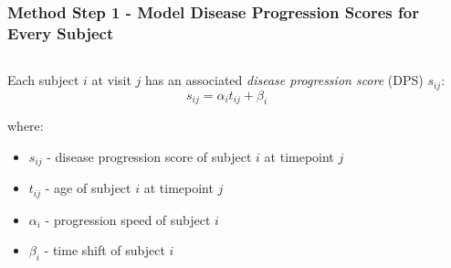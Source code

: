 \documentclass[8pt,xcolor=table]{beamer}
\begin{document}
\begin{frame}
\frametitle{Method Step 1 - Model Disease Progression Scores for Every Subject}

\begin{columns}[T]
    \begin{column}{.7\textwidth}
    
%       
% 
    
    
    \vspace{-2em}
   
    Each subject $i$ at visit $j$ has an associated \emph{disease progression score} (DPS) $s_{ij}$:
      $$s_{ij} = \alpha_i t_{ij} + \beta_i$$
      
      where:
      \begin{itemize}
       \item $s_{ij}$ - disease progression score of subject $i$ at timepoint $j$
       \item $t_{ij}$ - age of subject $i$ at timepoint $j$
       \item $\alpha_i $ - progression speed of subject $i$
       \item $\beta_i $ - time shift of subject $i$
      \end{itemize}
            
     

    \end{column}
    \hspace{-2em}
    \begin{column}{.25\textwidth}
    

\end{column}
\end{columns}
\end{frame}
\end{document}
